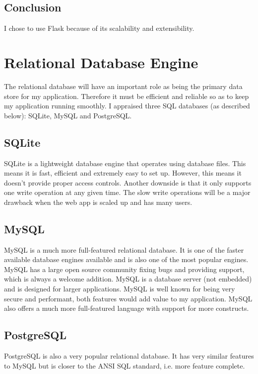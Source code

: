 \documentclass[a4paper,oneside,12pt]{report}
\begin{document}
	\subsection{Conclusion}
	I chose to use Flask because of its scalability and extensibility. 

	\section{Relational Database Engine}
	The relational database will have an important role as being the primary data store for my application. Therefore it must be efficient and reliable so as to keep my application running smoothly. I appraised three SQL databases (as described below): SQLite, MySQL and PostgreSQL.

	\subsection{SQLite}
	SQLite is a lightweight database engine that operates using database files. This means it is fast, efficient and extremely easy to set up. However, this means it doesn’t provide proper access controls. Another downside is that it only supports one write operation at any given time. The slow write operations will be a major drawback when the web app is scaled up and has many users.

	\subsection{MySQL}
	MySQL is a much more full-featured relational database. It is one of the faster available database engines available and is also one of the most popular engines. MySQL has a large open source community fixing bugs and providing support, which is always a welcome addition. MySQL is a database server (not embedded) and is designed for larger applications. MySQL is well known for being very secure and performant, both features would add value to my application. MySQL also offers a much more full-featured language with support for more constructs.

	\subsection{PostgreSQL}
	PostgreSQL is also a very popular relational database. It has very similar features to MySQL but is closer to the ANSI SQL standard, i.e. more feature complete. 
	
\end{document}
